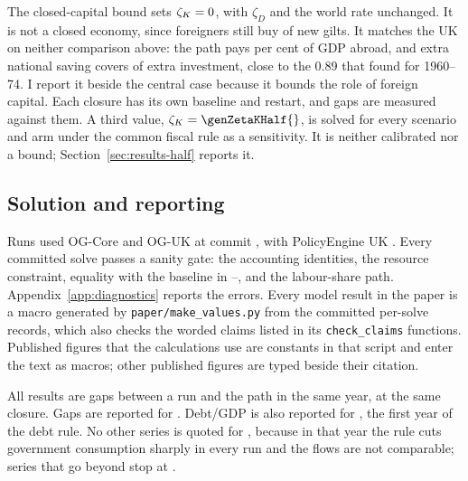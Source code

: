 The closed-capital bound sets $\zeta_K = 0{}$, with $\zeta_D$ and the world rate unchanged. It is not a closed economy, since foreigners still buy \genZetaD{} of new gilts. It matches the UK on neither comparison above: the path pays \genPaidAbroadBaseBound{} per cent of GDP abroad, and extra national saving covers \genUkCentralSavingShareBound{} of extra investment, close to the 0.89 that \citet{feldsteinhorioka1980} found for 1960--74. I report it beside the central case because it bounds the role of foreign capital. Each closure has its own baseline and restart, and gaps are measured against them. A third value, $\zetaK = \genZetaKHalf{}$, is solved for every scenario and arm under the common fiscal rule as a sensitivity. It is neither calibrated nor a bound; Section~\ref{sec:results-half} reports it.

\subsection{Solution and reporting}
\label{sec:solution}

Runs used OG-Core \genOgcoreVersion{} and OG-UK at commit \genOgukSha{}, with PolicyEngine UK \genPolicyengineUkVersion{}. Every committed solve passes a sanity gate: the accounting identities, the resource constraint, equality with the baseline in \genStartYear--\genRampZeroYear{}, and the labour-share path. Appendix~\ref{app:diagnostics} reports the errors. Every model result in the paper is a macro generated by \texttt{paper/make\_values.py} from the committed per-solve records, which also checks the worded claims listed in its \texttt{check\_claims} functions. Published figures that the calculations use are constants in that script and enter the text as macros; other published figures are typed beside their citation.

All results are gaps between a run and the path in the same year, at the same closure. Gaps are reported for \genHeadYear{}. Debt/GDP is also reported for \genDebtRuleYear{}, the first year of the debt rule. No other series is quoted for \genDebtRuleYear{}, because in that year the rule cuts government consumption sharply in every run and the flows are not comparable; series that go beyond \genHeadYear{} stop at \genLastFlowYear{}.

